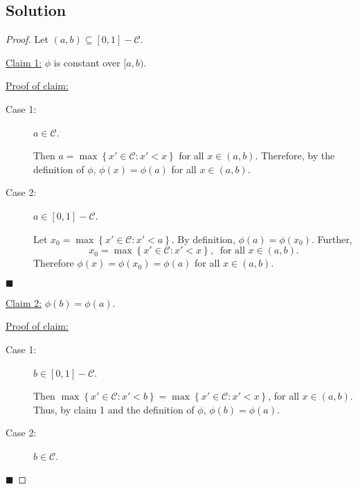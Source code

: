 \documentclass[12pt]{article}
\newenvironment{claimproof}[1]{\par\noindent\underline{Proof of claim:}\space#1}{\hfill $\blacksquare$\vspace{5mm}}
\begin{document}
\subsection*{Solution}
\begin{proof}
Let $(a,b) \subseteq [0,1] - \mathcal{C}$. 

\underline{Claim 1:} $\phi$ is constant over $[a,b)$.
\begin{claimproof}
\begin{description}
\item[Case 1:] $a \in \mathcal{C}$.

Then $a = \max\left\{ x' \in \mathcal{C} : x' < x \right\}$ for all $x \in (a,b)$. Therefore, by the definition of $\phi$, $\phi(x) = \phi(a)$ for all
$x \in (a,b)$.

\item[Case 2:] $a \in [0,1] - \mathcal{C}$.

Let $x_{0} = \max\left\{ x' \in \mathcal{C} : x' < a \right\}$. By definition, $\phi(a) = \phi(x_{0})$. Further, 
\[ x_{0} = \max\left\{ x' \in \mathcal{C} : x' < x \right\}, \ \text{ for all $x \in (a,b)$.} \]
Therefore $\phi(x) = \phi(x_{0}) = \phi(a)$ for all $x \in (a,b)$.
\end{description}
\end{claimproof}

\underline{Claim 2:} $\phi(b) = \phi(a)$.
\begin{claimproof}
\begin{description}
\item[Case 1:] $b \in [0,1] - \mathcal{C}$.

Then $\max\left\{ x' \in \mathcal{C} : x' < b \right\} = \max\left\{ x' \in \mathcal{C} : x' < x \right\}$, for all $x \in (a,b)$. Thus, by claim 1
and the definition of $\phi$, $\phi(b) = \phi(a)$.

\item[Case 2:] $b \in \mathcal{C}$.


\end{description}
\end{claimproof}
\end{proof}
\end{document}
